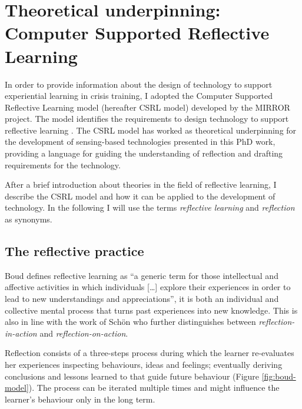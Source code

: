 \chapter[Theoretical underpinning:\\ Computer Supported Reflective Learning]{Theoretical underpinning: Computer Supported Reflective Learning}\label{csrl}


In order to provide information about the design of technology to support experiential learning in crisis training, I adopted the Computer Supported Reflective Learning model (hereafter CSRL model) developed by the MIRROR project. The model identifies the requirements to design technology to support reflective learning \autocite{Krogstie:2013kf}. The CSRL model has worked as theoretical underpinning for the development of sensing-based technologies presented in this PhD work, providing a language for guiding the understanding of reflection and drafting requirements for the technology.

After a brief introduction about theories in the field of reflective learning, I describe the CSRL model and how it can be applied to the development of technology. In the following I will use the terms \emph{reflective learning} and \emph{reflection} as synonyms.

\section{The reflective practice}\label{reflection}

Boud \autocite*{boud1985reflection} defines reflective learning as ``a generic term for those intellectual and affective activities in which individuals {[}\ldots{}{]} explore their experiences in order to lead to new understandings and appreciations'', it is both an individual and collective mental process that turns past experiences into new knowledge. This is also in line with the work of Sch\"on \autocite*{Schon:1983ut} who further distinguishes between \emph{reflection-in-action} and \emph{reflection-on-action}.

Reflection consists of a three-steps process during which the learner re-evaluates her experiences inspecting behaviours, ideas and feelings; eventually deriving conclusions and lessons learned to that guide future behaviour (Figure \ref{fig:boud-model}). The process can be iterated multiple times and might influence the learner's behaviour only in the long term.


